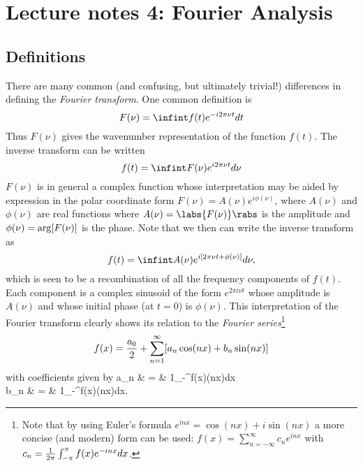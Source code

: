 %
\section{Lecture notes 4: Fourier Analysis}

\subsection{Definitions}

There are many common (and confusing, but ultimately trivial!)
differences in defining the {\it Fourier transform}. One common 
definition is 
\[
F(\nu)=\infint f(t)e^{-i2\pi\nu t}dt
\]
Thus $F(\nu)$ gives the wavenumber representation of the function
$f(t)$. The inverse transform can be written 
\[
f(t)=\infint F(\nu)e^{i2\pi\nu t}d\nu
\]
$F(\nu)$ is in general a complex function whose interpretation may be
aided by expression in the polar coordinate form
$F(\nu)=A(\nu)e^{i\phi(\nu)}$, where $A(\nu)$ and $\phi(\nu)$ are real
functions where $A(\nu)=\labs{F(\nu)}\rabs$ is the amplitude and $\phi(\nu)={\rm
  arg}[F(\nu)]$  is the phase. Note that we then can write the inverse 
transform as 
\[
f(t)=\infint A(\nu)e^{i[2\pi\nu t+\phi(\nu)]}d\nu,
\]
which is seen to be a recombination of all the frequency components of
$f(t)$. Each component is a complex sinusoid of the form $e^{2\pi i\nu t}$
whose amplitude is $A(\nu)$ and whose initial phase (at $t=0$) is
$\phi(\nu)$. This interpretation of the Fourier transform clearly
shows its relation to the {\it Fourier series}\footnote{Note that by 
using Euler's formula $e^{inx}=\cos(nx)+i\sin(nx)$ a more concise (and
modern) form can be used: $f(x)=\sum_{n=-\infty}^\infty c_n e^{inx}$
with $c_n={1\over 2\pi}\int_{-\pi}^{\pi} f(x)e^{-inx}dx$.} 
\[
f(x)={a_0\over 2}+\sum_{n=1}^\infty[a_n\cos(nx)+b_n\sin(nx)]
\]
with coefficients given by 
\bua
a_n & = & {1\over\pi}\int_{-\pi}^\pi f(x)\cos(nx)dx \\
b_n & = & {1\over\pi}\int_{-\pi}^\pi f(x)\sin(nx)dx.
\eua

